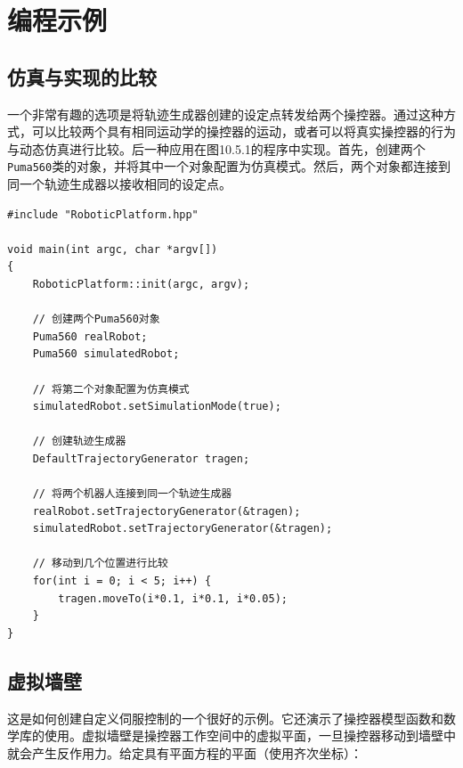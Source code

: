 \documentclass[UTF8,a4paper,12pt]{ctexart}
\begin{document}
\section{编程示例}

\subsection{仿真与实现的比较}

一个非常有趣的选项是将轨迹生成器创建的设定点转发给两个操控器。通过这种方式，可以比较两个具有相同运动学的操控器的运动，或者可以将真实操控器的行为与动态仿真进行比较。后一种应用在图10.5.1的程序中实现。首先，创建两个\texttt{Puma560}类的对象，并将其中一个对象配置为仿真模式。然后，两个对象都连接到同一个轨迹生成器以接收相同的设定点。

\begin{lstlisting}[caption={将相同轨迹转发给两个机器人的示例},label={lst:two-robots}]
#include "RoboticPlatform.hpp"

void main(int argc, char *argv[])
{
    RoboticPlatform::init(argc, argv);

    // 创建两个Puma560对象
    Puma560 realRobot;
    Puma560 simulatedRobot;

    // 将第二个对象配置为仿真模式
    simulatedRobot.setSimulationMode(true);

    // 创建轨迹生成器
    DefaultTrajectoryGenerator tragen;

    // 将两个机器人连接到同一个轨迹生成器
    realRobot.setTrajectoryGenerator(&tragen);
    simulatedRobot.setTrajectoryGenerator(&tragen);

    // 移动到几个位置进行比较
    for(int i = 0; i < 5; i++) {
        tragen.moveTo(i*0.1, i*0.1, i*0.05);
    }
}
\end{lstlisting}

\subsection{虚拟墙壁}

这是如何创建自定义伺服控制的一个很好的示例。它还演示了操控器模型函数和数学库的使用。虚拟墙壁是操控器工作空间中的虚拟平面，一旦操控器移动到墙壁中就会产生反作用力。给定具有平面方程的平面（使用齐次坐标）：
\end{document}
